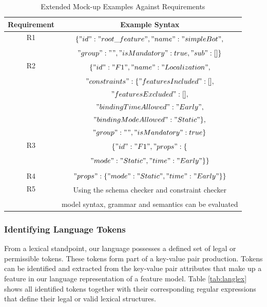 \documentclass[conference]{IEEEtran}
\begin{document}
\begin{table}[htbp]
\caption{Extended Mock-up Examples Against Requirements}
\begin{center}
\begin{tabular}{|c|c|}
\hline
    Requirement & Example Syntax  \\ \hline
     R1 & \multirow{2}{*}{$\{"id":"root\_feature","name":"simpleBot",$}\\
                        & \\
                        & $"group": "","isMandatory": true,"sub": []\}$\\ \hline
     R2 & \multirow{2}{*}{$\{"id": "F1","name": "Localization",$}\\ 
                        & \\
                        & $"constraints": \{"featuresIncluded": [],$\\ 
                        & $"featuresExcluded": [],$\\
                        &$"bindingTimeAllowed":"Early",$ \\
                        & $"bindingModeAllowed":"Static"\},$\\ 
                        & $"group": "","isMandatory": true\}$ \\
                         \hline
     R3 &  \multirow{2}{*}{$\{"id": "F1","props": \{$}\\
            & \\
            & $"mode": "Static","time": "Early"\}\}$\\
            & \\
            \hline
     R4 & $"props": \{"mode": "Static","time": "Early"\}\}$\\ \hline
     R5 & \multirow{2}{*}{Using the schema checker and constraint checker}\\ 
        & \\
        & model syntax, grammar and semantics can be evaluated\\ \hline
\end{tabular}
\label{tab:reqext}
\end{center}
\end{table}

\subsubsection{Identifying Language Tokens}
From a lexical standpoint, our language possesses a defined set of legal or permissible tokens. These tokens form part of a key-value pair production. Tokens can be identified and extracted from the key-value pair attributes that make up a feature in our language representation of a feature model. Table \ref{tab:langlex} shows all identified tokens together with their corresponding regular expressions that define their legal or valid lexical structures.
\end{document}
